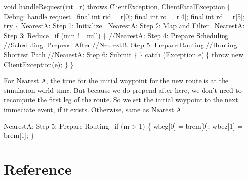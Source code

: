 \nwenddocs{}\endmoddef\nwstartdeflinemarkup{}\nwenddeflinemarkup
void handleRequest(int[] r) throws ClientException, ClientFatalException \{
  \LA{}Debug: handle request~{\nwtagstyle{}}\RA{}
  final int rid = r[0];
  final int ro  = r[4];
  final int rd  = r[5];
  try \{
    \LA{}NearestA: Step 1: Initialize~{\nwtagstyle{}}\RA{}
    \LA{}NearestA: Step 2: Map and Filter~{\nwtagstyle{}}\RA{}
    \LA{}NearestA: Step 3: Reduce~{\nwtagstyle{}}\RA{}
    if (min != null) \{
      //NearestA: Step 4: Prepare Scheduling
      //Scheduling: Prepend After
      //NearestB: Step 5: Prepare Routing
      //Routing: Shortest Path
      //NearestA: Step 6: Submit
    \}
  \} catch (Exception e) \{
    throw new ClientException(e);
  \}
\}
\nwendcode{}\nwdocspar

For Nearest A, the time for the initial waypoint for the new route is at the
simulation world time. But because we do prepend-after here, we don't need to
recompute the first leg of the route. So we set the initial waypoint to the
next immediate event, if it exists. Otherwise, same as Nearest A.

\nwenddocs{}\endmoddef\nwstartdeflinemarkup\nwenddeflinemarkup
\LA{}NearestA: Step 5: Prepare Routing~{\nwtagstyle{}}\RA{}
if (m > 1) \{
    wbeg[0] = brem[0];
    wbeg[1] = brem[1];
\}
\nwendcode{}\nwdocspar

\section{Reference}

